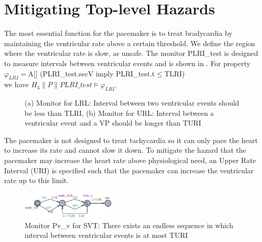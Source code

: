 \section{Mitigating Top-level Hazards}
The most essential function for the pacemaker is to treat bradycardia by maintaining the ventricular rate above a certain threshold. We define the region where the ventricular rate is slow, as \textsf{unsafe}. The monitor \textsf{PLRI\_test} is designed to measure intervals between ventricular events and is shown in . For property \\
\textsf{$\varphi_{LRI}=$A[] (PLRI\_test.secV imply PLRI\_test.t$\leq$TLRI)}\\ we have $H_4\| P\| PLRI\_test\models\varphi_{LRI}$.

\begin{figure}[t]
\centering
	\caption{(a) Monitor for LRL: Interval between two ventricular events should be less than TLRI, (b) Monitor for URL: Interval between a ventricular event and a VP should be longer than TURI}
\vspace{-10pt}
\end{figure} 

The pacemaker is not designed to treat tachycardia so it can only pace the heart to increase its rate and cannot slow it down. To mitigate the hazard that the pacemaker may increase the heart rate above physiological need, an Upper Rate Interval (URI) is specified such that the pacemaker can increase the ventricular rate up to this limit. 

\begin{figure}[b]
		\centering
		\includegraphics[width=0.4\textwidth]{figs/vv.pdf}
		\caption{\small Monitor \textsf{Pv\_v} for SVT: There exists an endless sequence in which interval between ventricular events is at most TURI}
		\label{fig:vv}
\end{figure}
  
